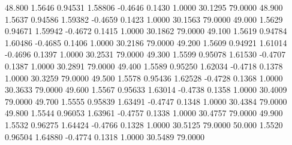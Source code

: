   48.800   1.5646   0.94531   1.58806  -0.4646   0.1430   1.0000  30.1295  79.0000
  48.900   1.5637   0.94586   1.59382  -0.4659   0.1423   1.0000  30.1563  79.0000
  49.000   1.5629   0.94671   1.59942  -0.4672   0.1415   1.0000  30.1862  79.0000
  49.100   1.5619   0.94784   1.60486  -0.4685   0.1406   1.0000  30.2186  79.0000
  49.200   1.5609   0.94921   1.61014  -0.4696   0.1397   1.0000  30.2531  79.0000
  49.300   1.5599   0.95078   1.61530  -0.4707   0.1387   1.0000  30.2891  79.0000
  49.400   1.5589   0.95250   1.62034  -0.4718   0.1378   1.0000  30.3259  79.0000
  49.500   1.5578   0.95436   1.62528  -0.4728   0.1368   1.0000  30.3633  79.0000
  49.600   1.5567   0.95633   1.63014  -0.4738   0.1358   1.0000  30.4009  79.0000
  49.700   1.5555   0.95839   1.63491  -0.4747   0.1348   1.0000  30.4384  79.0000
  49.800   1.5544   0.96053   1.63961  -0.4757   0.1338   1.0000  30.4757  79.0000
  49.900   1.5532   0.96275   1.64424  -0.4766   0.1328   1.0000  30.5125  79.0000
  50.000   1.5520   0.96504   1.64880  -0.4774   0.1318   1.0000  30.5489  79.0000
